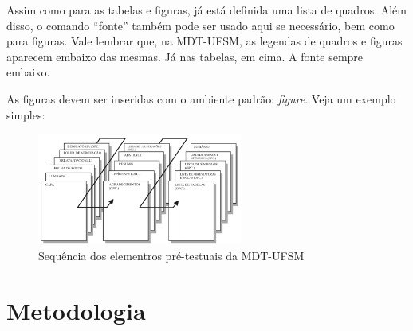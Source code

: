 \documentclass[oneside,openright,12pt]{ufsm_2015} %
\begin{document}
    
        \noindent Assim como para as tabelas e figuras, já está definida uma lista de quadros. Além disso, o comando ``fonte'' também pode ser usado aqui se necessário, bem como para figuras. Vale lembrar que, na MDT-UFSM, as legendas de quadros e figuras aparecem embaixo das mesmas. Já nas tabelas, em cima. A fonte sempre embaixo.
             
        \par As figuras devem ser inseridas com o ambiente padrão: \textit{figure}. Veja um exemplo simples:
             
        \begin{figure}[ht]
            \caption{\label{exepretex} Sequência dos elementros pré-testuais da MDT-UFSM}
          \centering
          \includegraphics[width=0.6\textwidth]{figuras/pretextuais.png}
          \vspace{\baselineskip} %
        \end{figure}
    
    \chapter{Metodologia}        
    

\end{document}
